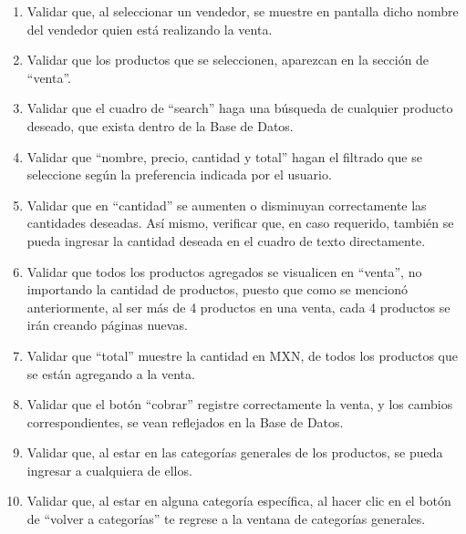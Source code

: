 \documentclass[a4paper,DIV=12]{scrreprt}
\begin{document}
\begin{enumerate}
\begin{itemize}
	    \end{itemize}
	    
	\item{Validar que, al seleccionar un vendedor, se muestre en pantalla dicho nombre del vendedor quien está realizando la venta. \\}
	\item{Validar que los productos que se seleccionen, aparezcan en la sección de “venta”. \\}
	\item{Validar que el cuadro de “search” haga una búsqueda de cualquier producto deseado, que exista dentro de la Base de Datos. \\}
	\item{Validar que “nombre, precio, cantidad y total” hagan el filtrado que se seleccione según la preferencia indicada por el usuario. \\}
	\item{Validar que en “cantidad” se aumenten o disminuyan correctamente las cantidades deseadas. Así mismo, verificar que, en caso requerido, también se pueda ingresar la cantidad deseada en el cuadro de texto directamente. \\}
	\item{Validar que todos los productos agregados se visualicen en “venta”, no importando la cantidad de productos, puesto que como se mencionó anteriormente, al ser más de 4 productos en una venta, cada 4 productos se irán creando páginas nuevas. \\}
	\item{Validar que “total” muestre la cantidad en MXN, de todos los productos que se están agregando a la venta. \\}
	\item{Validar que el botón “cobrar” registre correctamente la venta, y los cambios correspondientes, se vean reflejados en la Base de Datos.\\}
	\item{Validar que, al estar en las categorías generales de los productos, se pueda ingresar a cualquiera de ellos. \\}
	\item{Validar que, al estar en alguna categoría específica, al hacer clic en el botón de “volver a categorías” te regrese a la ventana de categorías generales. \\}

\end{enumerate}
\newpage

\newpage
\end{document}
